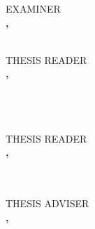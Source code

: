 \documentclass[a4paper, 12pt]{report}
\begin{document}
                \vspace{0.75 cm} 
            \else
                \vspace{0.75 cm} 
                \begin{minipage}[t]{.44\textwidth}\centering
                    EXAMINER\\
                    \vspace{0.1 cm} 
                    \textbf{\MakeUppercase{\examiner}, \examinerdegree}\\
                    \small{
                    \examinerposition\\
                    \examineruniv}
                \end{minipage}\hspace{.02\textwidth}
                \begin{minipage}[t]{.44\textwidth}\centering
                    THESIS READER\\
                \vspace{0.1 cm} 
                    \textbf{\MakeUppercase{\reader}, \readerdegree}\\
                    \small{
                    \readerposition\\
                    \readeruniv}\\
                    \vspace{0.75 cm} 
                \end{minipage}\\
            \fi
        \else
            \vspace{0.75 cm} 
            THESIS READER\\
            \vspace{0.1 cm} 
            \textbf{\MakeUppercase{\reader}, \readerdegree}\\
            \small{
            \readerposition\\
            \readeruniv}\\
        \fi
    \else
        \ifexaminer
            \ifexaminertwo
                \begin{minipage}[t]{.44\textwidth}\centering
                    THESIS ADVISER\\
                    \vspace{0.1 cm} 
                    \textbf{\MakeUppercase{\adviserone}, \adviseronedegree}\\
                    \small{
                    \adviseroneposition\\
                    \adviseroneuniv}
                \end{minipage}\hspace{.02\textwidth}
\end{document}
